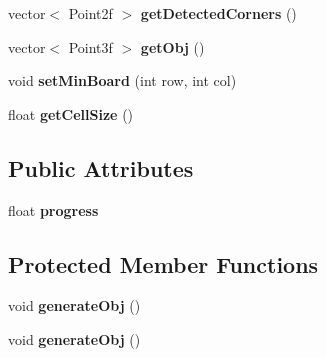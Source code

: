 \begin{DoxyCompactItemize}
\item 
vector$<$ Point2f $>$ {\bfseries get\+Detected\+Corners} ()\hypertarget{classautoSizeBoard_ab12d594e334279331ef0e2fd7e99f8d8}{}\label{classautoSizeBoard_ab12d594e334279331ef0e2fd7e99f8d8}

\item 
vector$<$ Point3f $>$ {\bfseries get\+Obj} ()\hypertarget{classautoSizeBoard_a11b95ae883d8ddb99c63c66ed52cf60d}{}\label{classautoSizeBoard_a11b95ae883d8ddb99c63c66ed52cf60d}

\item 
void {\bfseries set\+Min\+Board} (int row, int col)\hypertarget{classautoSizeBoard_aabf153bce08fd66c74c373d6641fd18e}{}\label{classautoSizeBoard_aabf153bce08fd66c74c373d6641fd18e}

\item 
float {\bfseries get\+Cell\+Size} ()\hypertarget{classautoSizeBoard_aab2271090efcd2fdbc2c4a7bfcd83865}{}\label{classautoSizeBoard_aab2271090efcd2fdbc2c4a7bfcd83865}

\end{DoxyCompactItemize}
\subsection*{Public Attributes}
\begin{DoxyCompactItemize}
\item 
float {\bfseries progress}\hypertarget{classautoSizeBoard_a332ce853a9edac61639b8c2af34b6f7a}{}\label{classautoSizeBoard_a332ce853a9edac61639b8c2af34b6f7a}

\end{DoxyCompactItemize}
\subsection*{Protected Member Functions}
\begin{DoxyCompactItemize}
\item 
void {\bfseries generate\+Obj} ()\hypertarget{classautoSizeBoard_affac18fa6bb8553f401ccfd423c03fb0}{}\label{classautoSizeBoard_affac18fa6bb8553f401ccfd423c03fb0}

\item 
void {\bfseries generate\+Obj} ()\hypertarget{classautoSizeBoard_affac18fa6bb8553f401ccfd423c03fb0}{}\label{classautoSizeBoard_affac18fa6bb8553f401ccfd423c03fb0}

\end{DoxyCompactItemize}
